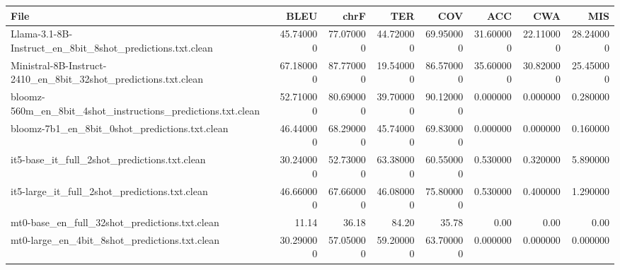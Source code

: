 \begin{tabular}{lrrrrrrr}
\toprule
File & BLEU & chrF & TER & COV & ACC & CWA & MIS \\
\midrule
Llama-3.1-8B-Instruct_en_8bit_8shot_predictions.txt.clean & 45.740000 & 77.070000 & 44.720000 & 69.950000 & 31.600000 & 22.110000 & 28.240000 \\
Ministral-8B-Instruct-2410_en_8bit_32shot_predictions.txt.clean & 67.180000 & 87.770000 & 19.540000 & 86.570000 & 35.600000 & 30.820000 & 25.450000 \\
bloomz-560m_en_8bit_4shot_instructions_predictions.txt.clean & 52.710000 & 80.690000 & 39.700000 & 90.120000 & 0.000000 & 0.000000 & 0.280000 \\
bloomz-7b1_en_8bit_0shot_predictions.txt.clean & 46.440000 & 68.290000 & 45.740000 & 69.830000 & 0.000000 & 0.000000 & 0.160000 \\
it5-base_it_full_2shot_predictions.txt.clean & 30.240000 & 52.730000 & 63.380000 & 60.550000 & 0.530000 & 0.320000 & 5.890000 \\
it5-large_it_full_2shot_predictions.txt.clean & 46.660000 & 67.660000 & 46.080000 & 75.800000 & 0.530000 & 0.400000 & 1.290000 \\
mt0-base_en_full_32shot_predictions.txt.clean & 11.14 & 36.18 & 84.20 & 35.78 & 0.00 & 0.00 & 0.00 \\
mt0-large_en_4bit_8shot_predictions.txt.clean & 30.290000 & 57.050000 & 59.200000 & 63.700000 & 0.000000 & 0.000000 & 0.000000 \\
\bottomrule
\end{tabular}
